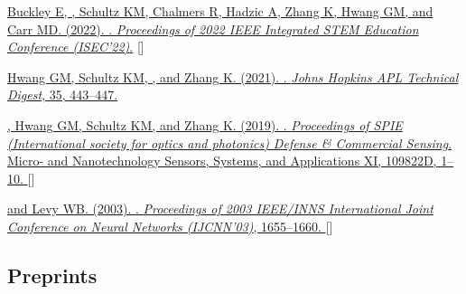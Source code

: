 \begin{description}[itemsep=9pt]
  \item \href{https://jdmonaco.com/files/buckley-2022-ISEC-author.pdf} {Buckley
      E, , Schultz KM, Chalmers R, Hadzic A, Zhang K, Hwang GM,
      and Carr MD. (2022). . \emph{Proceedings
    of 2022 IEEE Integrated STEM Education Conference (ISEC'22)}.}
    []
  \item \href{https://www.jhuapl.edu/Content/techdigest/pdf/V35-N04/35-04-Hwang.pdf}
    {Hwang GM, Schultz KM, , and Zhang K. (2021).
      . \emph{Johns Hopkins
    APL Technical Digest}, 35, 443--447.}
  \item \href{https://dx.doi.org/10.1117/12.2518966}
    {, Hwang GM, Schultz KM, and Zhang K. (2019).
      . \emph{Proceedings of SPIE (International society
      for optics and photonics) Defense \& Commercial Sensing}. Micro- and
      Nanotechnology Sensors, Systems, and Applications XI, 109822D, 1--10.
    }
    [\href{https://jdmonaco.com/files/monaco-SPIE2019-cognitive-swarming.pdf}{}]
  \item \href{https://dx.doi.org/10.1109/IJCNN.2003.1223655}
      { and Levy WB. (2003). . \emph{Proceedings of 2003 IEEE/INNS
        International Joint Conference on Neural Networks (IJCNN'03)}, 1655--1660.
      }
      [\href{https://jdmonaco.com/files/monaco-2003-tmaze.pdf}{}]
\end{description}

\renewcommand{\itemnote}[1]{}

\subsection*{Preprints}
\label{sec:preprints}
\vspace{-0.1in}

